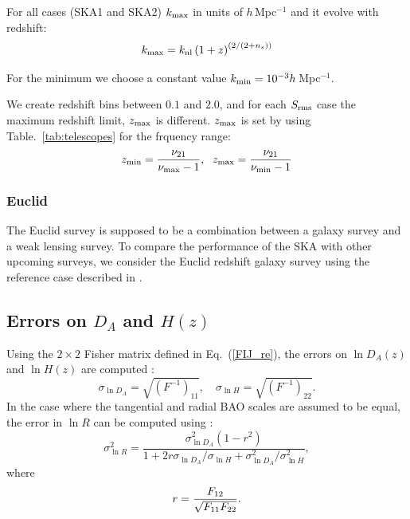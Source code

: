 \documentclass[useAMS,usenatbib]{mn2e}
\begin{document}
For all cases (SKA1 and SKA2) $k_{\rm max}$ in units of $ h\,$Mpc$^{-1}$ and  it evolve with redshift:
\begin{equation}
k_{\rm max} = k_{\rm nl} \left( 1+z  \right)^{(2/(2+n_s))}
\end{equation}

For the minimum we choose a constant value $k_{\rm min}  = 10^{-3}h\,$Mpc$^{-1}$. 

We create redshift bins between $0.1$ and $2.0$, and for each $S_{\rm rms}$ case the maximum redshift limit, $ z_{\rm max}$ is different.  $z_{\rm max}$ is  set by using Table.~\ref{tab:telescopes} for the frquency range:
\begin{equation}
z_{\rm min} = \frac{\nu_{21}}{\nu_{\rm max} - 1 }, \; \ z_{\rm max} = \frac{\nu_{21}}{\nu_{\rm min} - 1}
\end{equation}

\subsubsection{Euclid}\label{Euclid}
The  Euclid survey is supposed to be a combination between a galaxy survey and a weak lensing survey. To compare the performance of the SKA with other upcoming surveys, we consider the Euclid redshift galaxy survey using the reference  case described in \cite{2013LRR....16....6A}.   
%



\subsection{Errors on $D_A$ and $H(z)$}



Using  the $2\times2$ Fisher matrix defined in Eq.~(\ref{FIJ_re}), the errors on $\ln{D_A(z)}$ and $\ln{H(z)}$ are computed \citep{Seo:2007ns}:
\begin{equation}
\sigma_{\ln{D_A}}  = \sqrt{(F^{-1})_{11}}, \quad \sigma_{\ln{H}}  =  \sqrt{(F^{-1})_{22}} .
\end{equation}
In the case where the tangential and radial BAO scales are assumed to be equal, the error in  $\ln{R}$ can be computed using \citep{Seo:2007ns}:
\begin{equation}
 \sigma_{\ln R}^2
= \frac{\sigma_{\ln D_A}^2\left(1-r^2\right)}{1+2r\sigma_{\ln
D_A}/\sigma_{\ln H}+\sigma_{\ln D_A}^2/\sigma_{\ln H}^2},
\label{eq:sigmaR2}
\end{equation}
where 
\begin{equation}
r = {F_{12}\over \sqrt{F_{11} F_{22}}}.
\end{equation}
\end{document}
